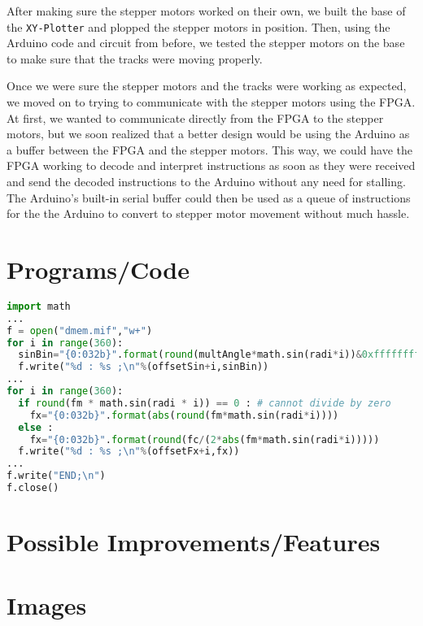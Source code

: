 \documentclass[12pt]{article}
\begin{document}
After making sure the stepper motors worked on their own, we built the base of the {\tt XY-Plotter} and plopped the stepper motors in position. Then, using the Arduino code and circuit from before, we tested the stepper motors on the base to make sure that the tracks were moving properly.

Once we were sure the stepper motors and the tracks were working as expected, we moved on to trying to communicate with the stepper motors using the FPGA. At first, we wanted to communicate directly from the FPGA to the stepper motors, but we soon realized that a better design would be using the Arduino as a buffer between the FPGA and the stepper motors. This way, we could have the FPGA working to decode and interpret instructions as soon as they were received and send the decoded instructions to the Arduino without any need for stalling. The Arduino's built-in serial buffer could then be used as a queue of instructions for the the Arduino to convert to stepper motor movement without much hassle.
\newpage
\section{Programs/Code}

\begin{lstlisting}[language=python, caption={Python Code for generating Lookup Tables in dmem.mif}, captionpos=b]
import math
... 
f = open("dmem.mif","w+")
for i in range(360):
  sinBin="{0:032b}".format(round(multAngle*math.sin(radi*i))&0xffffffff)
  f.write("%d : %s ;\n"%(offsetSin+i,sinBin))
...
for i in range(360):
  if round(fm * math.sin(radi * i)) == 0 : # cannot divide by zero
    fx="{0:032b}".format(abs(round(fm*math.sin(radi*i))))
  else :
    fx="{0:032b}".format(round(fc/(2*abs(fm*math.sin(radi*i)))))
  f.write("%d : %s ;\n"%(offsetFx+i,fx))
...
f.write("END;\n")
f.close()
\end{lstlisting}


\section{Possible Improvements/Features}

\section{Images}

\end{document}

